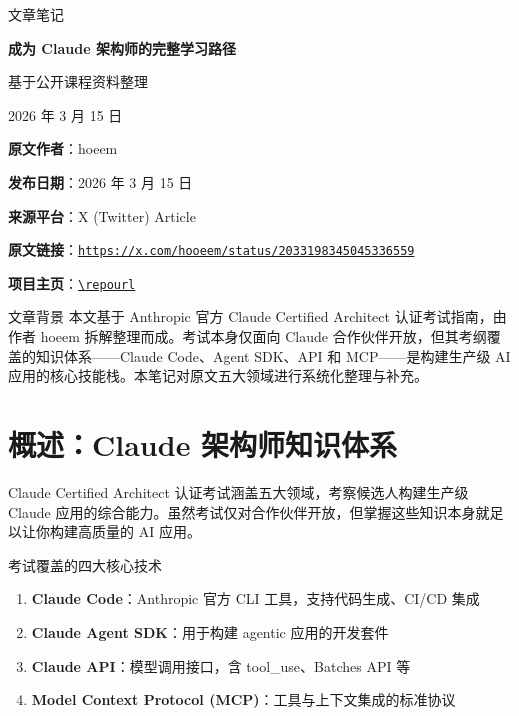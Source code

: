 \documentclass[a4paper]{article}
\newcommand{\notetitle}{成为 Claude 架构师的完整学习路径}
\newcommand{\noteauthors}{基于公开课程资料整理}
\newcommand{\notedate}{2026 年 3 月 15 日}
\newcommand{\articlechannel}{hoeem}
\newcommand{\articlepublishdate}{2026 年 3 月 15 日}
\newcommand{\articleurl}{https://x.com/hooeem/status/2033198345045336559}
\begin{document}
\begin{titlepage}
\centering
{\Large 文章笔记\par}
\vspace{1.2cm}
{\huge\bfseries \notetitle\par}
\vspace{0.8cm}
{\large \noteauthors\par}
\vspace{0.3cm}
{\large \notedate\par}
\vspace{2cm}

\begin{tcolorbox}[width=0.9\textwidth, colback=black!2!white, colframe=black!60, sharp corners]
\textbf{原文作者}：\articlechannel\par
\textbf{发布日期}：\articlepublishdate\par
\textbf{来源平台}：X (Twitter) Article\par
\textbf{原文链接}：\href{\articleurl}{\nolinkurl{\articleurl}}\par
\textbf{项目主页}：\href{\repourl}{\nolinkurl{\repourl}}\par
\end{tcolorbox}

\vfill

\begin{knowledgebox}{文章背景}
本文基于 Anthropic 官方 Claude Certified Architect 认证考试指南，由作者 hoeem 拆解整理而成。考试本身仅面向 Claude 合作伙伴开放，但其考纲覆盖的知识体系——Claude Code、Agent SDK、API 和 MCP——是构建生产级 AI 应用的核心技能栈。本笔记对原文五大领域进行系统化整理与补充。
\end{knowledgebox}

\end{titlepage}

\tableofcontents
\newpage


\section{概述：Claude 架构师知识体系}

Claude Certified Architect 认证考试涵盖五大领域，考察候选人构建生产级 Claude 应用的综合能力。虽然考试仅对合作伙伴开放，但掌握这些知识本身就足以让你构建高质量的 AI 应用。

\begin{importantbox}{考试覆盖的四大核心技术}
\begin{enumerate}[leftmargin=1.5em]
    \item \textbf{Claude Code}：Anthropic 官方 CLI 工具，支持代码生成、CI/CD 集成
    \item \textbf{Claude Agent SDK}：用于构建 agentic 应用的开发套件
    \item \textbf{Claude API}：模型调用接口，含 tool\_use、Batches API 等
    \item \textbf{Model Context Protocol (MCP)}：工具与上下文集成的标准协议
\end{enumerate}
\end{importantbox}
\end{document}

